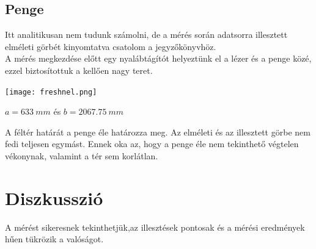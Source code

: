 \documentclass[a4paper,11pt]{article}
\begin{document}
\subsection{Penge}
Itt analitikusan nem tudunk számolni, de a mérés során adatsorra illesztett elméleti görbét kinyomtatva csatolom a jegyzőkönyvhöz. \\
A mérés megkezdése előtt egy nyalábtágítót helyeztünk el a lézer és a penge közé, ezzel biztosítottuk a kellően nagy teret. 
\begin{center}
\texttt{[image: freshnel.png]}
\end{center}
\begin{center}
$a=633~mm$ és $b=2067.75~mm$
\end{center}
A féltér határát a penge éle határozza meg. Az elméleti és az illesztett görbe nem fedi teljesen egymást. Ennek oka az, hogy a penge éle nem tekinthető végtelen vékonynak, valamint a tér sem korlátlan.

\section{Diszkusszió}
A mérést sikeresnek tekinthetjük,az illesztések pontosak és a mérési eredmények hűen tükrözik a valóságot.
\end{document}
